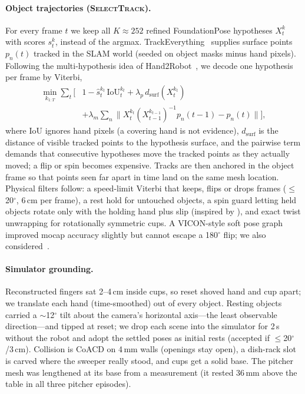 \documentclass[10pt]{nvidiaextabstract}
\newcommand{\method}{\textsc{SelectTrack}\xspace}
\begin{document}
\paragraph{Object trajectories (\method).} For every frame $t$ we keep all $K\!\approx\!252$ refined FoundationPose
hypotheses $X_t^k$ with scores $s_t^k$, instead of the argmax. TrackEverything~\citep{jain2026trackeverything} supplies
surface points $p_n(t)$ tracked in the SLAM world (seeded on object masks minus hand pixels). Following the multi-hypothesis
idea of Hand2Robot~\citep{du2026hand2robot}, we decode one hypothesis per frame by Viterbi,
\begin{equation}
\label{eq:viterbi}
\begin{aligned}
\min_{k_{1:T}} \sum_t \Big[&1 - \hat s_t^{k_t}\,\mathrm{IoU}_t^{k_t} + \lambda_p\, d_{\mathrm{surf}}(X_t^{k_t})\\
 &+ \lambda_m \textstyle\sum_n \big\| X_t^{k_t} (X_{t-1}^{k_{t-1}})^{-1} p_n(t\!-\!1) - p_n(t) \big\| \Big],
\end{aligned}
\end{equation}
where IoU ignores hand pixels (a covering hand is not evidence), $d_{\mathrm{surf}}$ is the distance of visible tracked
points to the hypothesis surface, and the pairwise term demands that consecutive hypotheses move the tracked points as they
actually moved; a flip or spin becomes expensive. Tracks are then anchored in the object frame so that points seen far apart
in time land on the same mesh location. Physical filters follow: a speed-limit Viterbi that keeps, flips or drops frames
($\leq$20$^\circ$, 6\,cm per frame), a rest hold for untouched objects, a spin guard letting held objects rotate only with
the holding hand plus slip (inspired by \citep{jeon2026vicon,shin2026compose}), and exact twist unwrapping for rotationally
symmetric cups. A VICON-style soft pose graph~\citep{jeon2026vicon} improved mocap accuracy slightly but cannot escape a
180$^\circ$ flip; we also considered~\citep{zhang2025tapip3d,tremblay2023diffdope,nguyen2025gotrack}.

\paragraph{Simulator grounding.} Reconstructed fingers sat 2--4\,cm inside cups, so reset shoved hand and cup apart; we
translate each hand (time-smoothed) out of every object. Resting objects carried a $\sim$12$^\circ$ tilt about the camera's
horizontal axis---the least observable direction---and tipped at reset; we drop each scene into the simulator for 2\,s
without the robot and adopt the settled poses as initial rests (accepted if $\leq$20$^\circ$/3\,cm). Collision is CoACD
\citep{wei2022coacd} on 4\,mm walls (openings stay open), a dish-rack slot is carved where the sweeper really stood, and
cups get a solid base. The pitcher mesh was lengthened at its base from a measurement (it rested 36\,mm above the table in
all three pitcher episodes).
\end{document}
